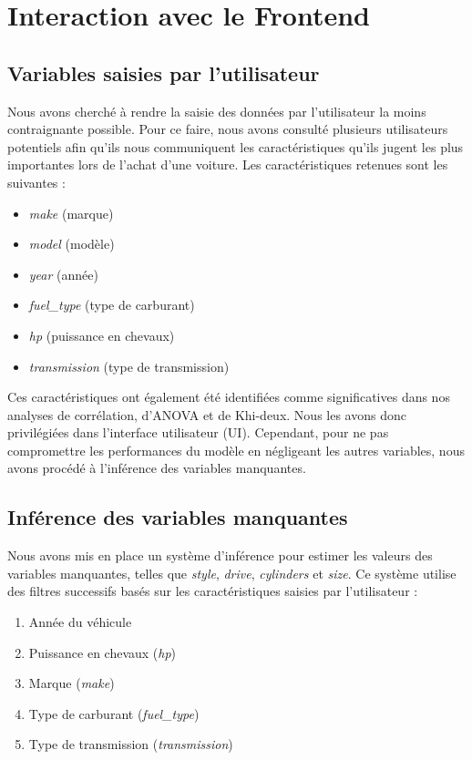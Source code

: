 \documentclass[12pt]{report}
\begin{document}
\section{Interaction avec le Frontend}

\subsection{Variables saisies par l'utilisateur}

Nous avons cherché à rendre la saisie des données par l'utilisateur la moins contraignante possible. Pour ce faire, nous avons consulté plusieurs utilisateurs potentiels afin qu'ils nous communiquent les caractéristiques qu'ils jugent les plus importantes lors de l'achat d'une voiture. Les caractéristiques retenues sont les suivantes :
\begin{itemize}
    \item \textit{make} (marque)
    \item \textit{model} (modèle)
    \item \textit{year} (année)
    \item \textit{fuel\_type} (type de carburant)
    \item \textit{hp} (puissance en chevaux)
    \item \textit{transmission} (type de transmission)
\end{itemize}

Ces caractéristiques ont également été identifiées comme significatives dans nos analyses de corrélation, d'ANOVA et de Khi-deux. Nous les avons donc privilégiées dans l'interface utilisateur (UI). Cependant, pour ne pas compromettre les performances du modèle en négligeant les autres variables, nous avons procédé à l'inférence des variables manquantes.

\subsection{Inférence des variables manquantes}

Nous avons mis en place un système d'inférence pour estimer les valeurs des variables manquantes, telles que \textit{style}, \textit{drive}, \textit{cylinders} et \textit{size}. Ce système utilise des filtres successifs basés sur les caractéristiques saisies par l'utilisateur :
\begin{enumerate}
    \item Année du véhicule
    \item Puissance en chevaux (\textit{hp})
    \item Marque (\textit{make})
    \item Type de carburant (\textit{fuel\_type})
    \item Type de transmission (\textit{transmission})
\end{enumerate}
\end{document}
